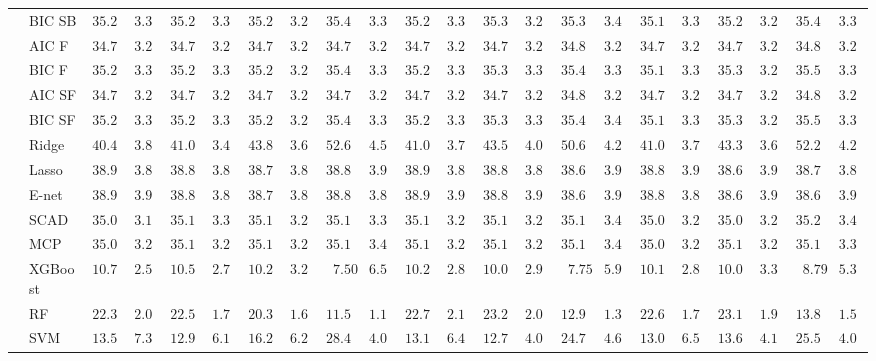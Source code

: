 \begin{tabular}{ll|ll|llllll|llllll|llllll}
 & BIC SB  & $35.27$ & $3.31$ & $35.26$ & $3.35$ & $35.29$ & $3.26$ & $35.40$ & $3.35$ & $35.25$ & $3.31$ & $35.30$ & $3.28$ & $35.36$ & $3.40$ & $35.14$ & $3.31$ & $35.27$ & $3.28$ & $35.42$ & $3.33$ \\
 & AIC F  & $34.71$ & $3.22$ & $34.76$ & $3.28$ & $34.75$ & $3.28$ & $34.77$ & $3.27$ & $34.74$ & $3.25$ & $34.76$ & $3.27$ & $34.83$ & $3.29$ & $34.75$ & $3.25$ & $34.75$ & $3.23$ & $34.82$ & $3.27$ \\
 & BIC F  & $35.27$ & $3.31$ & $35.26$ & $3.35$ & $35.29$ & $3.26$ & $35.49$ & $3.32$ & $35.25$ & $3.31$ & $35.34$ & $3.32$ & $35.44$ & $3.38$ & $35.17$ & $3.33$ & $35.30$ & $3.29$ & $35.50$ & $3.38$ \\
 & AIC SF  & $34.71$ & $3.22$ & $34.76$ & $3.28$ & $34.75$ & $3.28$ & $34.77$ & $3.27$ & $34.74$ & $3.25$ & $34.76$ & $3.27$ & $34.83$ & $3.29$ & $34.75$ & $3.25$ & $34.75$ & $3.23$ & $34.82$ & $3.27$ \\
 & BIC SF  & $35.27$ & $3.31$ & $35.26$ & $3.35$ & $35.29$ & $3.26$ & $35.49$ & $3.32$ & $35.25$ & $3.31$ & $35.34$ & $3.32$ & $35.45$ & $3.40$ & $35.17$ & $3.33$ & $35.30$ & $3.29$ & $35.50$ & $3.38$ \\
 & Ridge  & $40.44$ & $3.81$ & $41.01$ & $3.48$ & $43.83$ & $3.63$ & $52.60$ & $4.57$ & $41.06$ & $3.78$ & $43.57$ & $4.09$ & $50.65$ & $4.23$ & $41.08$ & $3.72$ & $43.35$ & $3.64$ & $52.23$ & $4.26$ \\
 & Lasso  & $38.96$ & $3.89$ & $38.81$ & $3.87$ & $38.79$ & $3.85$ & $38.89$ & $3.93$ & $38.96$ & $3.89$ & $38.86$ & $3.89$ & $38.66$ & $3.97$ & $38.82$ & $3.92$ & $38.68$ & $3.96$ & $38.72$ & $3.88$ \\
 & E-net  & $38.99$ & $3.94$ & $38.82$ & $3.89$ & $38.76$ & $3.87$ & $38.82$ & $3.89$ & $38.94$ & $3.95$ & $38.87$ & $3.91$ & $38.63$ & $3.93$ & $38.83$ & $3.89$ & $38.66$ & $3.97$ & $38.64$ & $3.90$ \\
 & SCAD  & $35.00$ & $3.18$ & $35.10$ & $3.30$ & $35.12$ & $3.21$ & $35.10$ & $3.35$ & $35.16$ & $3.21$ & $35.10$ & $3.23$ & $35.10$ & $3.40$ & $35.03$ & $3.26$ & $35.08$ & $3.20$ & $35.23$ & $3.41$ \\
 & MCP  & $35.07$ & $3.21$ & $35.14$ & $3.28$ & $35.11$ & $3.21$ & $35.15$ & $3.40$ & $35.17$ & $3.26$ & $35.10$ & $3.21$ & $35.11$ & $3.41$ & $35.04$ & $3.27$ & $35.10$ & $3.21$ & $35.15$ & $3.38$ \\
 & XGBoost  & $10.72$ & $2.51$ & $10.55$ & $2.78$ & $10.27$ & $3.22$ & $\phantom{0}7.50$ & $6.52$ & $10.24$ & $2.80$ & $10.08$ & $2.98$ & $\phantom{0}7.75$ & $5.92$ & $10.13$ & $2.88$ & $10.01$ & $3.38$ & $\phantom{0}8.79$ & $5.38$ \\
 & RF  & $22.38$ & $2.08$ & $22.55$ & $1.79$ & $20.35$ & $1.66$ & $11.55$ & $1.10$ & $22.70$ & $2.18$ & $23.22$ & $2.04$ & $12.96$ & $1.39$ & $22.69$ & $1.73$ & $23.17$ & $1.96$ & $13.89$ & $1.53$ \\
 & SVM  & $13.54$ & $7.36$ & $12.97$ & $6.14$ & $16.26$ & $6.20$ & $28.47$ & $4.00$ & $13.15$ & $6.46$ & $12.78$ & $4.08$ & $24.75$ & $4.67$ & $13.05$ & $6.56$ & $13.65$ & $4.10$ & $25.58$ & $4.09$ \\
\hline 
\end{tabular}

